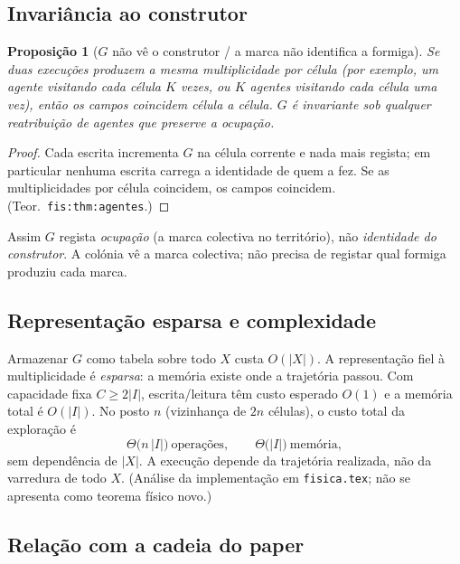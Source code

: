 \documentclass[11pt,a4paper]{article}
\newtheorem{proposicao}{Proposição}
\begin{document}
\subsection{Invariância ao construtor}

\begin{proposicao}[\(G\) não vê o construtor / a marca não identifica a formiga]
\label{prop:G-construtor}
Se duas execuções produzem a mesma multiplicidade por célula (por exemplo, um agente visitando cada célula \(K\) vezes, ou \(K\) agentes visitando cada célula uma vez), então os campos coincidem célula a célula. \(G\) é invariante sob qualquer reatribuição de agentes que preserve a ocupação.
\end{proposicao}

\begin{proof}
Cada escrita incrementa \(G\) na célula corrente e nada mais regista; em particular nenhuma escrita carrega a identidade de quem a fez. Se as multiplicidades por célula coincidem, os campos coincidem. (Teor.\ \texttt{fis:thm:agentes}.)
\end{proof}

Assim \(G\) regista \emph{ocupação} (a marca colectiva no território), não \emph{identidade do construtor}. A colónia vê a marca colectiva; não precisa de registar qual formiga produziu cada marca.

\subsection{Representação esparsa e complexidade}

Armazenar \(G\) como tabela sobre todo \(X\) custa \(O(\lvert X\rvert)\). A representação fiel à multiplicidade é \emph{esparsa}: a memória existe onde a trajetória passou. Com capacidade fixa \(C\ge 2\lvert I\rvert\), escrita/leitura têm custo esperado \(O(1)\) e a memória total é \(O(\lvert I\rvert)\). No posto \(n\) (vizinhança de \(2n\) células), o custo total da exploração é
\[
\Theta\bigl(n\,\lvert I\rvert\bigr)\ \text{operações},\qquad
\Theta\bigl(\lvert I\rvert\bigr)\ \text{memória},
\]
sem dependência de \(\lvert X\rvert\). A execução depende da trajetória realizada, não da varredura de todo \(X\). (Análise da implementação em \texttt{fisica.tex}; não se apresenta como teorema físico novo.)

\subsection{Relação com a cadeia do paper}
\end{document}
